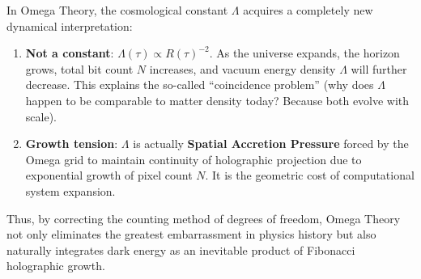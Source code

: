 In Omega Theory, the cosmological constant $\Lambda$ acquires a completely new dynamical interpretation:

\begin{enumerate}
\item \textbf{Not a constant}: $\Lambda(\tau) \propto R(\tau)^{-2}$. As the universe expands, the horizon grows, total bit count $N$ increases, and vacuum energy density $\Lambda$ will further decrease. This explains the so-called ``coincidence problem'' (why does $\Lambda$ happen to be comparable to matter density today? Because both evolve with scale).
\item \textbf{Growth tension}: $\Lambda$ is actually \textbf{Spatial Accretion Pressure} forced by the Omega grid to maintain continuity of holographic projection due to exponential growth of pixel count $N$. It is the geometric cost of computational system expansion.
\end{enumerate}

Thus, by correcting the counting method of degrees of freedom, Omega Theory not only eliminates the greatest embarrassment in physics history but also naturally integrates dark energy as an inevitable product of Fibonacci holographic growth.
